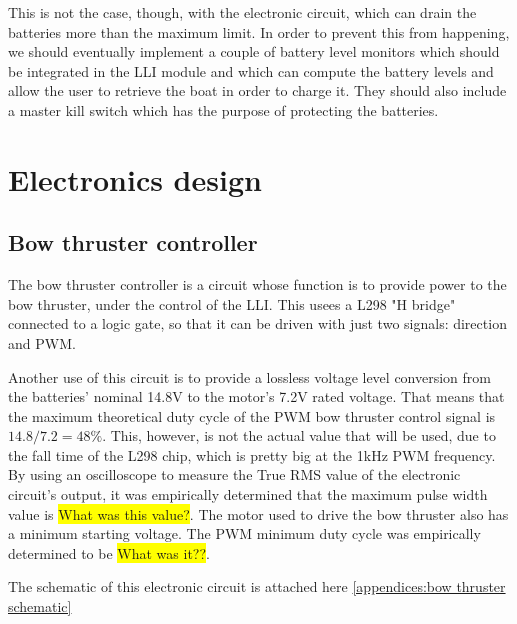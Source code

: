 This is not the case, though, with the electronic circuit, which can drain the batteries more than the maximum limit. In order to prevent this from happening, we should eventually implement a couple of battery level monitors which should be integrated in the \ac{LLI} module and which can compute the battery levels and allow the user to retrieve the boat in order to charge it. They should also include a master kill switch which has the purpose of protecting the batteries.

\section{Electronics design}

\subsection{Bow thruster controller}
\label{subsec:bow thruster controller}

The bow thruster controller is a circuit whose function is to provide power to the bow thruster, under the control of the \ac{LLI}. This usees a L298 "H bridge" connected to a logic gate, so that it can be driven with just two signals: direction and \ac{PWM}.

Another use of this circuit is to provide a lossless voltage level conversion from the batteries' nominal 14.8V to the motor's 7.2V rated voltage. That means that the maximum theoretical duty cycle of the PWM bow thruster control signal is $ 14.8 / 7.2 = 48 \% $. This, however, is not the actual value that will be used, due to the fall time of the L298 chip, which is pretty big at the 1kHz PWM frequency. By using an oscilloscope to measure the True RMS value of the electronic circuit's output, it was empirically determined that the maximum pulse width value is \colorbox{yellow}{What was this value?}. 
The motor used to drive the bow thruster also has a minimum starting voltage. The PWM minimum duty cycle was empirically determined to be \colorbox{yellow}{What was it??}.

The schematic of this electronic circuit is attached here \ref{appendices:bow thruster schematic}